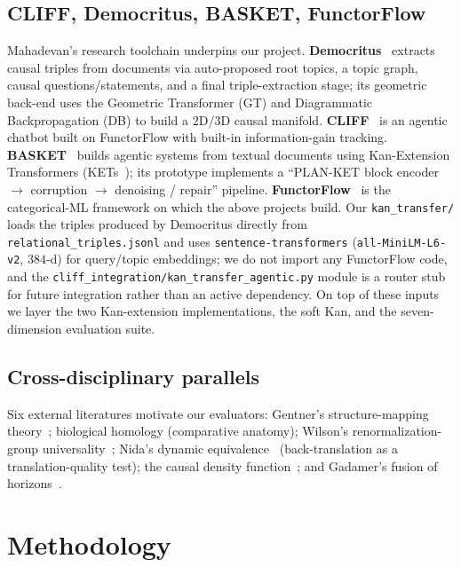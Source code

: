 \documentclass[10pt,letterpaper]{article}
\begin{document}
\subsection{CLIFF, Democritus, BASKET, FunctorFlow~\cite{cliff,democritus_repo,basket,functorflow}}

Mahadevan's research toolchain underpins our project. \textbf{Democritus}~\cite{democritus_repo} extracts causal triples from documents via auto-proposed root topics, a topic graph, causal questions/statements, and a final triple-extraction stage; its geometric back-end uses the Geometric Transformer (GT) and Diagrammatic Backpropagation (DB) to build a $2$D/$3$D causal manifold. \textbf{CLIFF}~\cite{cliff} is an agentic chatbot built on FunctorFlow with built-in information-gain tracking. \textbf{BASKET}~\cite{basket} builds agentic systems from textual documents using Kan-Extension Transformers (KETs~\cite{ket}); its prototype implements a ``PLAN-KET block encoder $\to$ corruption $\to$ denoising / repair'' pipeline. \textbf{FunctorFlow}~\cite{functorflow} is the categorical-ML framework on which the above projects build. Our \texttt{kan\_transfer/} loads the triples produced by Democritus directly from \texttt{relational\_triples.jsonl} and uses \texttt{sentence-transformers} (\texttt{all-MiniLM-L6-v2}, $384$-d) for query/topic embeddings; we do not import any FunctorFlow code, and the \texttt{cliff\_integration/kan\_transfer\_agentic.py} module is a router stub for future integration rather than an active dependency. On top of these inputs we layer the two Kan-extension implementations, the soft Kan, and the seven-dimension evaluation suite.

\subsection{Cross-disciplinary parallels}

Six external literatures motivate our evaluators: Gentner's structure-mapping theory~\cite{gentner}; biological homology (comparative anatomy); Wilson's renormalization-group universality~\cite{wilson}; Nida's dynamic equivalence~\cite{nida} (back-translation as a translation-quality test); the causal density function~\cite{catagi}; and Gadamer's fusion of horizons~\cite{gadamer}.

\section{Methodology}
\end{document}
